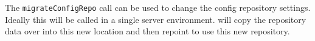 The \verb+migrateConfigRepo+ call can be used to change the config repository settings. Ideally this will be
called in a single server environment. \Rapture will copy the repository data over into this new location and then
repoint to use this new repository.
